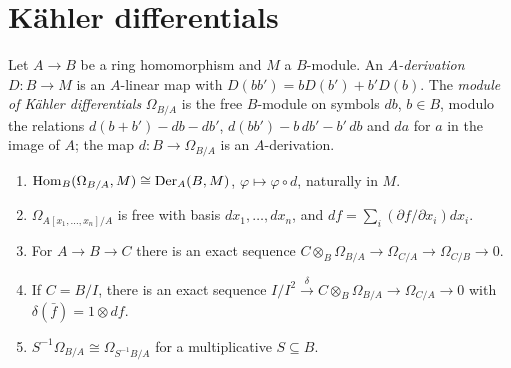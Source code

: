 \section{K\"ahler differentials}\label{commutative-algebra:section-differentials}

\begin{definition}\label{commutative-algebra:definition-derivation}
Let $A \to B$ be a ring homomorphism and $M$ a $B$-module. An \emph{$A$-derivation} $D \colon B \to M$ is an $A$-linear map with
$D(bb') = bD(b') + b'D(b)$. The \emph{module of K\"ahler differentials} $\Omega_{B/A}$ is the free $B$-module on symbols $db$,
$b \in B$, modulo the relations $d(b + b') - db - db'$, $d(bb') - b\,db' - b'\,db$ and $da$ for $a$ in the image of $A$; the map
$d \colon B \to \Omega_{B/A}$ is an $A$-derivation.
\end{definition}

\begin{proposition}\label{commutative-algebra:proposition-differentials}
\begin{enumerate}
\item $\operatorname{Hom}_B(\Omega_{B/A}, M) \cong \operatorname{Der}_A(B, M)$, $\varphi \mapsto \varphi \circ d$, naturally in $M$.
\item $\Omega_{A[x_1, \ldots, x_n]/A}$ is free with basis $dx_1, \ldots, dx_n$, and $df = \sum_i (\partial f/\partial x_i)dx_i$.
\item For $A \to B \to C$ there is an exact sequence $C \otimes_B \Omega_{B/A} \to \Omega_{C/A} \to \Omega_{C/B} \to 0$.
\item If $C = B/I$, there is an exact sequence $I/I^2 \xrightarrow{\delta} C \otimes_B \Omega_{B/A} \to \Omega_{C/A} \to 0$ with
$\delta(\bar f) = 1 \otimes df$.
\item $S^{-1}\Omega_{B/A} \cong \Omega_{S^{-1}B/A}$ for a multiplicative $S \subseteq B$.
\end{enumerate}
\end{proposition}

